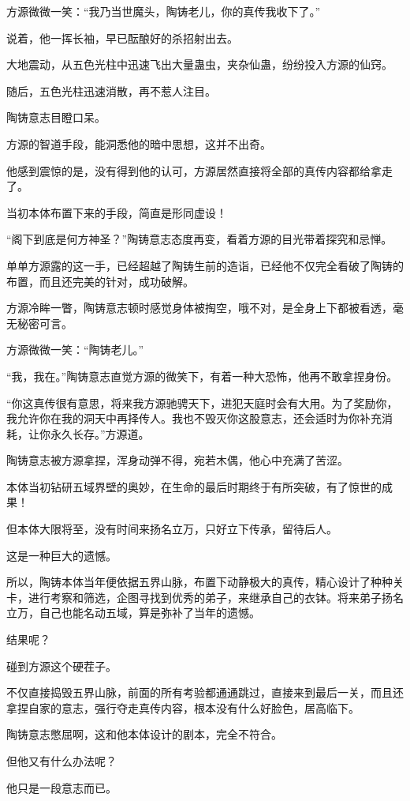 \begin{this_body}
方源微微一笑：“我乃当世魔头，陶铸老儿，你的真传我收下了。”

说着，他一挥长袖，早已酝酿好的杀招射出去。

大地震动，从五色光柱中迅速飞出大量蛊虫，夹杂仙蛊，纷纷投入方源的仙窍。

随后，五色光柱迅速消散，再不惹人注目。

陶铸意志目瞪口呆。

方源的智道手段，能洞悉他的暗中思想，这并不出奇。

他感到震惊的是，没有得到他的认可，方源居然直接将全部的真传内容都给拿走了。

当初本体布置下来的手段，简直是形同虚设！

“阁下到底是何方神圣？”陶铸意志态度再变，看着方源的目光带着探究和忌惮。

单单方源露的这一手，已经超越了陶铸生前的造诣，已经他不仅完全看破了陶铸的布置，而且还完美的针对，成功破解。

方源冷眸一瞥，陶铸意志顿时感觉身体被掏空，哦不对，是全身上下都被看透，毫无秘密可言。

方源微微一笑：“陶铸老儿。”

“我，我在。”陶铸意志直觉方源的微笑下，有着一种大恐怖，他再不敢拿捏身份。

“你这真传很有意思，将来我方源驰骋天下，进犯天庭时会有大用。为了奖励你，我允许你在我的洞天中再择传人。我也不毁灭你这股意志，还会适时为你补充消耗，让你永久长存。”方源道。

陶铸意志被方源拿捏，浑身动弹不得，宛若木偶，他心中充满了苦涩。

本体当初钻研五域界壁的奥妙，在生命的最后时期终于有所突破，有了惊世的成果！

但本体大限将至，没有时间来扬名立万，只好立下传承，留待后人。

这是一种巨大的遗憾。

所以，陶铸本体当年便依据五界山脉，布置下动静极大的真传，精心设计了种种关卡，进行考察和筛选，企图寻找到优秀的弟子，来继承自己的衣钵。将来弟子扬名立万，自己也能名动五域，算是弥补了当年的遗憾。

结果呢？

碰到方源这个硬茬子。

不仅直接捣毁五界山脉，前面的所有考验都通通跳过，直接来到最后一关，而且还拿捏自家的意志，强行夺走真传内容，根本没有什么好脸色，居高临下。

陶铸意志憋屈啊，这和他本体设计的剧本，完全不符合。

但他又有什么办法呢？

他只是一段意志而已。


\end{this_body}
